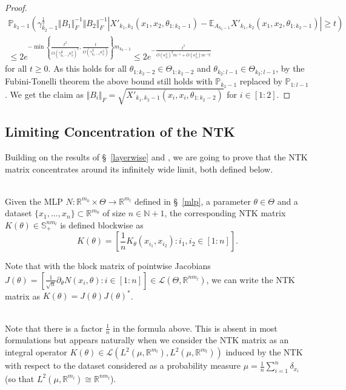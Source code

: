 \documentclass[twoside,11pt]{article}
\newcommand{\R}{\mathbb{R}}
\newcommand{\N}{\mathbb{N}}
\newcommand{\E}{\mathbb{E}}
\newcommand{\Ell}{\mathcal{L}}
\newcommand{\Prob}{\mathbb{P}}
\begin{document}
\begin{proof}
\begin{multline*}
\Prob_{k_2-1}\left( \gamma_{k_2-1}^{\frac{1}{2}} \Vert B_1 \Vert_F^{-1} \Vert B_2 \Vert_F^{-1} \left\vert X'_{k_1,k_2}(x_1,x_2,\theta_{1:k_2-1}) 
- \E_{A_{k_2-1}} X'_{k_1,k_2}(x_1,x_2,\theta_{1:k_2-1}) \right\vert \geq t  \right) \\
\leq 2e^{-\min\left\{ \frac{t^2}{O(\gamma_{k_2-1}^{\frac{1}{2}} \kappa_\phi^2)^2}, \frac{t}{O(\gamma_{k_2-1}^{\frac{1}{2}} \kappa_\phi^2)} \right\} m_{k_2-1}} 
\leq 2e^{-\frac{t^2}{O(\kappa_\phi^2)^2 m^{-1} + O(\kappa_\phi^2) m^{-1} t}}
\end{multline*}
for all $t \geq 0$. As this holds for all $\theta_{1:k_2-2} \in \Theta_{1:k_2-2}$ and $\theta_{k_2:l-1} \in \Theta_{k_2:l-1}$, by the Fubini-Tonelli theorem the above bound still holds with $\Prob_{k_2-1}$ replaced by $\Prob_{1:l-1}$. We get the claim as $\Vert B_i \Vert_F = \sqrt{X'_{k_1,k_2-1}(x_i,x_i,\theta_{1:k_2-2})}$ for $i \in [1:2]$.
\end{proof}

\subsection{Limiting Concentration of the NTK}\label{limiting}

Building on the results of \S~\ref{layerwise} and \citet{mlpsateoc1}, we are going to prove that the NTK matrix concentrates around its infinitely wide limit, both defined below.

\begin{definition}\label{def:ntk_matrix}~\\
Given the MLP $N : \R^{m_0} \times \Theta \to \R^{m_l}$ defined in \S~\ref{mlp}, a parameter $\theta \in \Theta$ and a dataset $\{x_1,\ldots,x_n\}\subset \R^{m_0}$ of size $n \in \N+1$, the corresponding NTK matrix $K(\theta) \in \mathbb{S}^{n m_l}_+$ is defined blockwise as 
\[
K(\theta) = \left[ \frac{1}{n} K_\theta(x_{i_1},x_{i_2}) : i_1,i_2 \in [1:n] \right].
\]
\end{definition}
Note that with the block matrix of pointwise Jacobians $J(\theta) = [ \frac{1}{\sqrt{n}} \partial_\theta N(x_i,\theta) : i \in [1:n]] \in \Ell(\Theta, \R^{n m_l})$, we can write the NTK matrix as $K(\theta) = J(\theta) J(\theta)^*$.

\begin{remark}~\\
Note that there is a factor $\frac{1}{n}$ in the formula above. This is absent in most formulations but appears naturally when we consider the NTK matrix as an integral operator $K(\theta) \in \Ell(L^2(\mu,\R^{m_l}),L^2(\mu,\R^{m_l}))$ induced by the NTK with respect to the dataset considered as a probability measure $\mu = \frac{1}{n} \sum_{i=1}^n \delta_{x_i}$ (so that $L^2(\mu,\R^{m_l}) \cong \R^{n m_l}$).
\end{remark}
\end{document}
